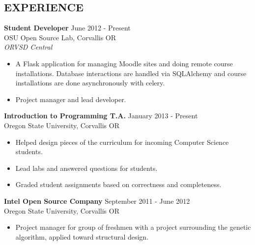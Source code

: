 \documentclass[margin]{res}
\begin{document}
\begin{resume}
\section{EXPERIENCE} 
                \textbf{Student Developer} \hfill June 2012 - Present \\
                OSU Open Source Lab, Corvallis OR \\
                {\sl ORVSD Central} 
                \begin{itemize}  \itemsep -2pt %
                    \item A Flask application for managing Moodle sites and doing remote course installations.
                          Database interactions are handled via SQLAlchemy and course installations are done asynchronously 
                          with celery.
                    \item Project manager and lead developer.
                \end{itemize}
                \textbf{Introduction to Programming T.A.}  \hfill January 2013 - Present  \\
                Oregon State University, Corvallis OR
                \begin{itemize}  \itemsep -2pt %
                \item Helped design pieces of the curriculum for incoming Computer Science students.
                \item Lead labs and answered questions for students.
                \item Graded student assignments based on correctness and completeness.
                \end{itemize} 
                \textbf {Intel Open Source Company} \hfill September 2011 - June 2012 \\
                Oregon State University, Corvallis OR 
                   \begin{itemize} \itemsep -2pt
                    \item Project manager for group of freshmen with a project surrounding the genetic algorithm,
                          applied toward structural design.
                    \end{itemize} 
  

\end{resume}
\end{document}
